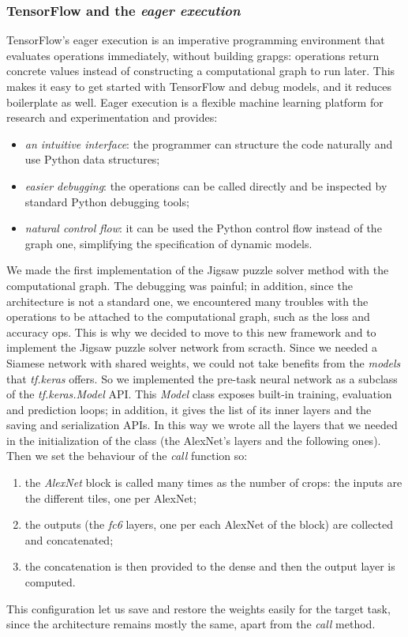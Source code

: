 \subsubsection{TensorFlow and the \emph{eager execution}}
TensorFlow's eager execution is an imperative programming environment that evaluates operations immediately, without building grapgs: operations return concrete values instead of constructing a computational graph to run later. This makes it easy to get started with TensorFlow and debug models, and it reduces boilerplate as well. Eager execution is a flexible machine learning platform for research and experimentation and provides:
\begin{itemize}
    \item \textit{an intuitive interface}: the programmer can structure the code naturally and use Python data structures;
    \item \textit{easier debugging}: the operations can be called directly and be inspected by standard Python debugging tools;
    \item \textit{natural control flow}: it can be used the Python control flow instead of the graph one, simplifying the specification of dynamic models.
\end{itemize}
We made the first implementation of the Jigsaw puzzle solver method with the computational graph. The debugging was painful; in addition, since the architecture is not a standard one, we encountered many troubles with the operations to be attached to the computational graph, such as the loss and accuracy ops. This is why we decided to move to this new framework and to implement the Jigsaw puzzle solver network from scracth.\newline
Since we needed a Siamese network with shared weights, we could not take benefits from the \emph{models} that \emph{tf.keras} offers. So we implemented the pre-task neural network as a subclass of the \emph{tf.keras.Model} API. This \emph{Model} class exposes built-in training, evaluation and prediction loops; in addition, it gives the list of its inner layers and the saving and serialization APIs. In this way we wrote all the layers that we needed in the initialization of the class (the AlexNet's layers and the following ones). Then we set the behaviour of the \emph{call} function so:
\begin{enumerate}
    \item the \emph{AlexNet} block is called many times as the number of crops: the inputs are the different tiles, one per AlexNet;
    \item the outputs (the \textit{fc6} layers, one per each AlexNet of the block) are collected and concatenated;
    \item the concatenation is then provided to the dense and then the output layer is computed.
\end{enumerate}
This configuration let us save and restore the weights easily for the target task, since the architecture remains mostly the same, apart from the \emph{call} method.


